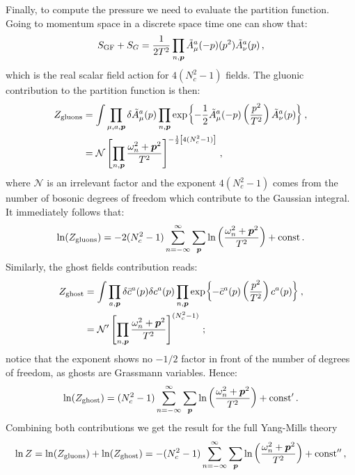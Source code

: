 \documentclass{article}
\begin{document}
Finally, to compute the pressure we need to evaluate the partition function. Going to momentum space in a discrete space time one can show that:
\begin{equation}
    S_{\textrm{GF}} + S_G = \frac{1}{2T^2}\prod_{n, \vb*{p}} \tilde{A}_\mu^a (-p) (p^2) \tilde{A}_\nu^a (p) \, , 
\end{equation}
which is the real scalar field action for $4(N_c^2 - 1)$ fields.
The gluonic contribution to the partition function is then:
\begin{align*}
    Z_{\textrm{gluons}} &= \int \prod_{\mu, a, \vb*{p}} \delta \tilde{A}_\mu^a(p) \prod_{n, \vb*{p}} \exp{-\frac{1}{2} \tilde{A}_\mu^a (-p) \left(\frac{p^2}{T^2}\right) \tilde{A}_\nu^a (p)} \, , \\
        &= \mathcal{N} \left[ \prod_{n, \vb*{p}} \frac{\omega_n^2 + \vb*{p}^2}{T^2} \right]^{-\frac{1}{2} \left[ 4(N^2_c - 1) \right]} \, , 
\end{align*}
where $\mathcal{N}$ is an irrelevant factor and the exponent $4(N_c^2 - 1)$ comes from the number of bosonic degrees of freedom which contribute to the Gaussian integral. It immediately follows that:
\begin{equation}\label{eq: Zgluons}
    \ln(Z_{\textrm{gluons}}) = -2(N_c^2 - 1) \sum_{n = -\infty}^{\infty} \sum_{\vb*{p}} \ln \left( \frac{\omega_n^2 + \vb*{p}^2}{T^2} \right) + \textrm{const} \, .
\end{equation}
Similarly, the ghost fields contribution reads:
\begin{align*}
    Z_{\textrm{ghost}} &= \int \prod_{a, \vb*{p}} \delta \bar{c}^a(p) \delta c^a(p) \prod_{n, \vb*{p}} \exp{- \bar{c}^a (p) \left(\frac{p^2}{T^2}\right) c^a (p)} \, , \\
        &= \mathcal{N}' \left[ \prod_{n, \vb*{p}} \frac{\omega_n^2 + \vb*{p}^2}{T^2} \right]^{(N^2_c - 1)} \, ;
\end{align*}
notice that the exponent shows no $-1/2$ factor in front of the number of degrees of freedom, as ghosts are Grassmann variables. Hence:
\begin{equation}\label{eq: Zghost}
    \ln(Z_{\textrm{ghost}}) = (N_c^2 - 1) \sum_{n = -\infty}^{\infty} \sum_{\vb*{p}} \ln \left( \frac{\omega_n^2 + \vb*{p}^2}{T^2} \right) + \textrm{const}' \, .
\end{equation}
Combining both contributions we get the result for the full Yang-Mills theory
\begin{equation}
    \ln Z = \ln(Z_{\textrm{gluons}}) + \ln(Z_{\textrm{ghost}}) = -(N_c^2 - 1) \sum_{n = -\infty}^{\infty} \sum_{\vb*{p}} \ln \left( \frac{\omega_n^2 + \vb*{p}^2}{T^2} \right) + \textrm{const}'' \, ,
\end{equation}
\end{document}
